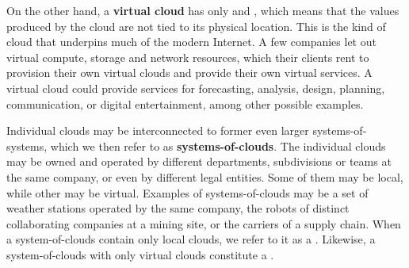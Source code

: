 On the other hand, a \textbf{virtual cloud} has only  and , which means that the values produced by the cloud are not tied to its physical location.
This is the kind of cloud that underpins much of the modern Internet.
A few companies let out virtual compute, storage and network resources, which their clients rent to provision their own virtual clouds and provide their own virtual services.
A virtual cloud could provide services for forecasting, analysis, design, planning, communication, or digital entertainment, among other possible examples.

Individual clouds may be interconnected to former even larger systems-of-systems, which we then refer to as \textbf{systems-of-clouds}.
The individual clouds may be owned and operated by different departments, subdivisions or teams at the same company, or even by different legal entities.
Some of them may be local, while other may be virtual.
Examples of systems-of-clouds may be a set of weather stations operated by the same company, the robots of distinct collaborating companies at a mining site, or the carriers of a supply chain.
When a system-of-clouds contain only local clouds, we refer to it as a .
Likewise, a system-of-clouds with only virtual clouds constitute a .
